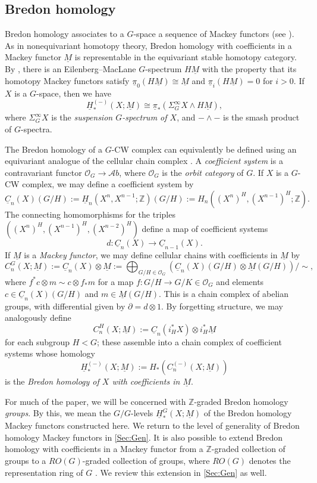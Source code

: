 \documentclass[11pt]{amsart}
\theoremstyle{definition}
\numberwithin{equation}{subsection} %
\def\z{\mathbb{Z}}
\def\co{\mathcal{O}}
\def\uM{\underline{M}}
\def\uC{\underline{C}}
\def\uH{\underline{H}}
\def\uM{\underline{M}}
\def\Ab{\mathcal{A}b}
\def\upi{\underline{\pi}}
\newcommand{\Z}{\mathbb{Z}}
\begin{document}
\subsection{Bredon homology}\label{SS:Bredon}

Bredon homology associates to a $G$-space a sequence of Mackey functors (see \cite[\S IX.4]{May96}). As in nonequivariant homotopy theory, Bredon homology with coefficients in a Mackey functor $\uM$ is representable in the equivariant stable homotopy category. By \cite[Theorem XIII.4.1]{May96}, there is an Eilenberg--MacLane $G$-spectrum $H\uM$ with the property that its homotopy Mackey functors satisfy $\upi_0(H\uM) \cong \uM$ and $\upi_i(H\uM)=0$ for $i>0$. If $X$ is a $G$-space, then we have
$$\uH_*^{(-)}(X;\uM) \cong \upi_*(\Sigma^\infty_G X \wedge H\uM),$$
where $\Sigma^\infty_G X$ is the \emph{suspension $G$-spectrum of $X$}, and $- \wedge - $ is the smash product of $G$-spectra. 

The Bredon homology of a $G$-CW complex can equivalently be defined using an equivariant analogue of the cellular chain complex \cite[\S I.4]{May96}. A \emph{coefficient system} is a contravariant functor $\co_G \to \Ab$, where $\co_G$ is the \emph{orbit category} of $G$. If $X$ is a $G$-CW complex, we may define a coefficient system by
$$\uC_n(X)(G/H) := \uH_n(X^n,X^{n-1}; \z)(G/H) := H_n((X^n)^H,(X^{n-1})^H; \z).$$
The connecting homomorphisms for the triples $((X^n)^H, (X^{n-1})^H, (X^{n-2})^H)$ define a map of coefficient systems
$$d: \uC_n(X) \to \uC_{n-1}(X).$$
If $\uM$ is a \emph{Mackey functor}, we may define cellular chains with coefficients in $\uM$ by
$$C_n^G(X;\uM) := \uC_n(X) \otimes \uM := \bigoplus_{G/H \in \co_G} \left( \uC_n(X)(G/H) \otimes \uM(G/H) \right)/\sim,$$
where $f^*c\otimes m \sim c \otimes f_*m$ for a map $f: G/H \to G/K \in \co_G$ and elements $c \in \uC_n(X)(G/H)$ and $m \in \uM(G/H)$. This is a chain complex of abelian groups, with differential given by $\partial = d \otimes 1$. By forgetting structure, we may analogously define 
$$C_n^H(X;\uM) := \uC_n(i^*_HX) \otimes i^*_H \uM$$
for each subgroup $H < G$; these assemble into a chain complex of coefficient systems whose homology
$$\uH_*^{(-)}(X;\uM) := H_*(C_n^{(-)}(X;\uM))$$
is the \emph{Bredon homology of $X$ with coefficients in $\uM$}. 

For much of the paper, we will be concerned with $\Z$-graded Bredon homology \emph{groups}. By this, we mean the $G/G$-levels $\uH_*^{G}(X;\uM)$ of the Bredon homology Mackey functors constructed here. We return to the level of generality of Bredon homology Mackey functors in \cref{Sec:Gen}. It is also possible to extend Bredon homology with coefficients in a Mackey functor from a $\Z$-graded collection of groups to a $RO(G)$-graded collection of groups, where $RO(G)$ denotes the representation ring of $G$ \cite[\S IX.5]{May96}. We review this extension in \cref{Sec:Gen} as well. 
\end{document}
